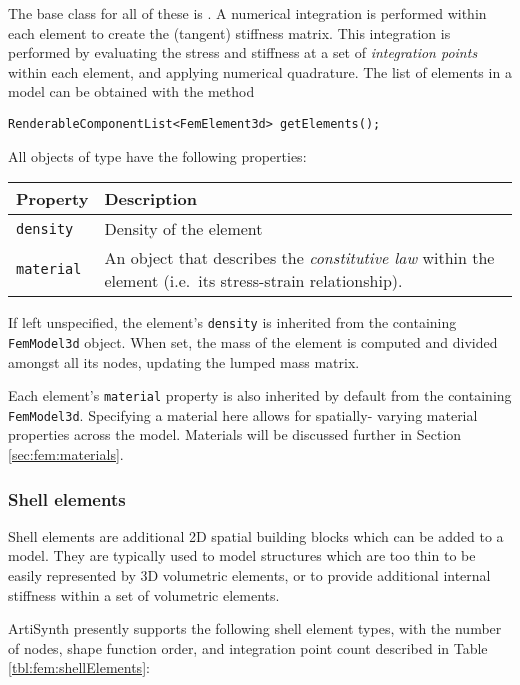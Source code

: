 The base class for all of these is .  A numerical integration is performed within each element
to create the (tangent) stiffness matrix.  This integration is performed
by evaluating the stress and stiffness at a set of \emph{integration points}
within each element, and applying numerical quadrature.  The list of elements
in a model can be obtained with the method
\begin{lstlisting}[]
  RenderableComponentList<FemElement3d> getElements();
\end{lstlisting}

All objects of type  have the 
following properties:
\begin{center}
\begin{tabular}{|ll|}
  \hline
  Property & Description\\
  \hline
  {\tt density} & Density of the element\\
  {\tt material} & An object that describes the \emph{constitutive law} 
                   within the element (i.e.~its stress-strain 
                   relationship).\\
  \hline
\end{tabular}
\end{center}

If left unspecified, the element's {\tt density} is inherited from the 
containing {\tt FemModel3d} object.  When set, the mass of the element is
computed and divided amongst all its nodes, updating the lumped mass
matrix.

Each element's {\tt material} property is also inherited by default from the 
containing {\tt FemModel3d}. Specifying a material here allows for spatially-%
varying material properties across the model.  Materials will be discussed
further in Section \ref{sec:fem:materials}.

\subsubsection{Shell elements}

Shell elements are additional 2D spatial building blocks which can be
added to a model. They are typically used to model structures which
are too thin to be easily represented by 3D volumetric elements, or to
provide additional internal stiffness within a set of volumetric
elements.

ArtiSynth presently supports the following shell element types, with
the number of nodes, shape function order, and integration point count
described in Table \ref{tbl:fem:shellElements}:

